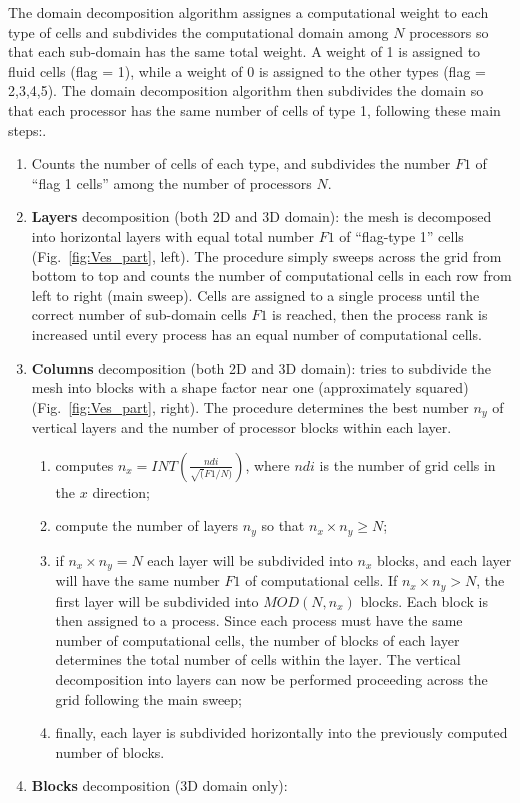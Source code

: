 The domain decomposition algorithm assignes a computational weight to each type 
of cells and subdivides the computational domain
among $N$ processors so that each sub-domain has the same total weight.
A weight of 1 is assigned to fluid cells (flag = 1),
while a weight of 0 is assigned to the other types (flag = 2,3,4,5). 
The domain decomposition algorithm then subdivides the domain so that each processor
has the same number of cells of type 1, following these main steps:.\\
\begin{enumerate}
\item Counts the number of cells of each type, and subdivides the number $F1$ of ``flag 1 cells''
 among the number of processors $N$.
\item {\bf Layers} decomposition (both 2D and 3D domain): the mesh is decomposed into horizontal layers with equal total number
$F1$ of ``flag-type 1'' cells (Fig.~\ref{fig:Ves_part}, left). The procedure simply sweeps across
the grid from bottom to top and counts the number of computational cells in each row from
left to right (main sweep). Cells are assigned to a single process until the correct number 
of sub-domain cells $F1$ is reached, then the process rank is increased until every 
process has an equal number of computational cells.
\item {\bf Columns} decomposition (both 2D and 3D domain): tries to subdivide the mesh into blocks with a shape factor near one
(approximately squared) (Fig.~\ref{fig:Ves_part}, right). The procedure determines the best number
$n_y$ of vertical layers and the number of processor blocks within each layer.
\begin{enumerate}
\item computes $\displaystyle n_x = INT\left(\frac{ndi}{\sqrt(F1/N)}\right)$, where $ndi$ is the
number of grid cells in the $x$ direction;
\item compute the number of layers $n_y$ so that $n_x \times n_y \ge N$;
\item if $n_x \times n_y = N$ each layer will be subdivided into $n_x$ blocks, and each layer
will have the same number $F1$ of computational cells. If $n_x \times n_y > N$, the first 
layer will be subdivided into $MOD(N,n_x)$ blocks. Each block is then assigned to 
a process. Since each process must have the same number of computational cells, the number
of blocks of each layer determines the total number of cells within the layer. The vertical
decomposition into layers can now be performed proceeding across the grid following the
main sweep;
\item finally, each layer is subdivided horizontally into the previously computed number
of blocks. 
\end{enumerate}
\item {\bf Blocks} decomposition (3D domain only): 
\end{enumerate}

